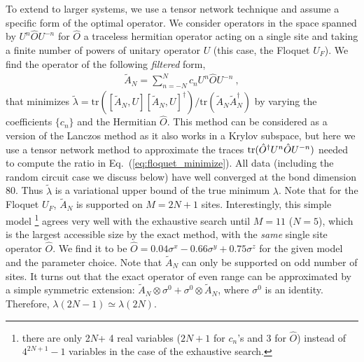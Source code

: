 \documentclass[twocolumn,superscriptaddress, prb]{revtex4-1}
\begin{document}

To extend to larger systems, we use a tensor network technique and assume a specific form of the optimal operator.
We consider operators in the space spanned by $U^n \hat{O} U^{- n}$ for $\hat{O}$ a traceless hermitian operator acting on a single site
and taking a finite number of powers of unitary operator $U$ (this case, the Floquet $U_F$).
We find the operator of the following {\it filtered} form,
\begin{align}
 \tilde{A}_N=\sum_{n=-N}^N c_n U^n \hat{O} U^{- n} ~,
 \label{eq:filter}
\end{align}
that minimizes $\tilde{\lambda} = \mathrm{tr}([\tilde{A}_N,U][\tilde{A}_N,U]^\dag)/\mathrm{tr}(\tilde{A}_N\tilde{A}_N^\dag)$
by varying the coefficients $\{c_n\}$ and the Hermitian $\hat{O}$.
This method can be considered as a version of the Lanczos method as it also works in a Krylov subspace,
but here we use a tensor network method to approximate the traces ${\rm tr}(\hat{O}^\dagger U^n \hat{O} U^{-n})$ needed to compute the ratio in Eq.~(\ref{eq:floquet_minimize}). All data (including the random circuit case we discuss below) have well converged at the bond dimension 80.
Thus $\tilde{\lambda}$ is a variational upper bound of the true minimum $\lambda$.
Note that for the Floquet $U_F$, $\tilde{A}_N$ is supported on $M = 2N+1$ sites.
Interestingly, this simple model \footnote{there are only 2$N$+ 4 real variables ($2N+1$ for $c_n$'s and 3 for $\hat{O}$) instead of $4^{2N+1} - 1$ variables
in the case of the exhaustive search.}
agrees very well with the exhaustive search until $M = 11$ ($N = 5$), which is the largest accessible size by the exact method,
with the {\it same} single site operator $\hat{O}$.
We find it to be $\hat{O} = 0.04\sigma^x  - 0.66\sigma^y + 0.75\sigma^z$ for the given model and the parameter choice.
Note that $\tilde{A}_N$ can only be supported on odd number of sites.
It turns out that the exact operator of even range can be approximated by a simple symmetric extension:
$\tilde{A}_N\otimes \sigma^0 + \sigma^0\otimes\tilde{A}_N$, where $\sigma^0$ is an identity.
Therefore, $\lambda(2N-1) \simeq \lambda(2N)$.
\end{document}
